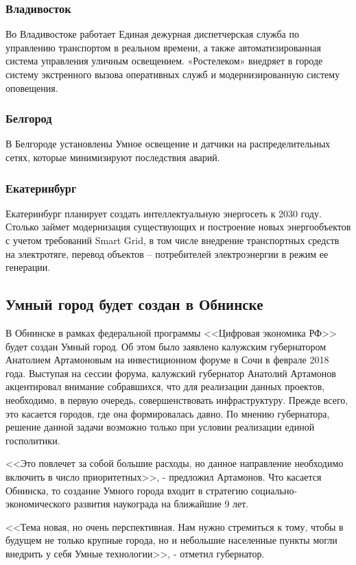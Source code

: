\subsubsection{Владивосток}
Во Владивостоке работает Единая дежурная диспетчерская служба по управлению транспортом в реальном времени, а также автоматизированная система управления уличным освещением. «Ростелеком» внедряет в городе систему экстренного вызова оперативных служб и модернизированную систему оповещения.
\subsubsection{Белгород}
В Белгороде установлены Умное освещение и датчики на распределительных сетях, которые минимизируют последствия аварий.
\subsubsection{Екатеринбург}
Екатеринбург планирует создать интеллектуальную энергосеть к 2030 году. Столько займет модернизация существующих и построение новых энергообъектов с учетом требований Smart Grid, в том числе внедрение транспортных средств на электротяге, перевод объектов – потребителей электроэнергии в режим ее генерации.

\subsection{Умный город будет создан в Обнинске}
В Обнинске в рамках федеральной программы <<Цифровая экономика РФ>> будет создан Умный город. Об этом было заявлено калужским губернатором Анатолием Артамоновым на инвестиционном форуме в Сочи в феврале 2018 года.\cite{smartcityObn}
Выступая на сессии форума, калужский губернатор Анатолий Артамонов акцентировал внимание собравшихся, что для реализации данных проектов, необходимо, в первую очередь, совершенствовать инфраструктуру. Прежде всего, это касается городов, где она формировалась давно. По мнению губернатора, решение данной задачи возможно только при условии реализации единой госполитики. 

<<Это повлечет за собой большие расходы, но данное направление необходимо включить в число приоритетных>>, - предложил Артамонов. Что касается Обнинска, то создание Умного города входит в стратегию социально-экономического развития наукограда на ближайшие 9 лет. 

<<Тема новая, но очень перспективная. Нам нужно стремиться к тому, чтобы в будущем не только крупные города, но и небольшие населенные пункты могли внедрить у себя Умные технологии>>, - отметил губернатор. 

